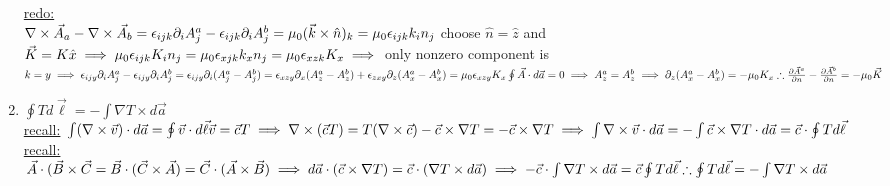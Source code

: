 \documentclass[12pt]{amsart}
\begin{document}
\begin{enumerate}
\underline{redo:}\\
$\nabla \times \vec{A}_a - \nabla \times \vec{A}_b = \epsilon_{ijk} \partial_i A_j^a - \epsilon_{ijk} \partial_i A^b_j\\
= \mu_0 (\vec{k} \times \hat{n})_k = \mu_0 \epsilon_{ijk} k_i n_j\\$
choose $\hat{n} = \hat{z}$ and $\vec{K} = K \hat{x}\\
\implies \mu_0 \epsilon_{ijk} K_i n_j = \mu_0 \epsilon_{x j k} k_x n_j = \mu_0 \epsilon_{xzk} K_x\\
\implies$ only nonzero component is $k=y\\
\implies \epsilon_{ijy} \partial_i A_j^a - \epsilon_{ijy} \partial_i A_j^b\\
= \epsilon_{ijy} \partial_i ( A_j^a - A_j^b) = \epsilon_{xzy} \partial_x (A_z^a- A_z^b) + \epsilon_{zxy} \partial_z (A_x^a - A_x^b) = \mu_0 \epsilon_{xzy} K_x\\
\oint \vec{A} \cdot d \vec{a} = 0 \implies A_z^a = A^b_z\\
\implies \partial_z ( A_x^a - A_x^b) = - \mu_0 K_x\\
\therefore \frac{\partial \vec{A}^a}{\partial n} - \frac{\partial \vec{A}^b}{\partial n} = - \mu_0 \vec{K}$


\hdashrule[0.5ex][c]{\linewidth}{0.5pt}{1.5mm}


\item \underline{$\oint T d \vec{\ell} = - \int \nabla T \times d \vec{a}$}\\
\underline{recall:} $\int (\nabla \times \vec{v}) \cdot d \vec{a} = \oint \vec{v} \cdot d \vec{\ell}\\
\vec{v} = \vec{c} T\\
\implies \nabla \times ( \vec{c} T) = T ( \nabla \times \vec{c}) - \vec{c} \times \nabla T = - \vec{c} \times \nabla T\\
\implies \int \nabla \times \vec{v} \cdot d \vec{a} = - \int \vec{c} \times \nabla T \cdot d \vec{a} = \vec{c} \cdot \oint T d \vec{\ell}\\$
\underline{recall:} $\vec{A} \cdot ( \vec{B} \times \vec{C} = \vec{B} \cdot ( \vec{C} \times \vec{A}) = \vec{C} \cdot ( \vec{A} \times \vec{B})\\
\implies d \vec{a} \cdot ( \vec{c} \times \nabla T) = \vec{c} \cdot ( \nabla T \times d \vec{a})\\
\implies - \vec{c} \cdot \int \nabla T \times d \vec{a} = \vec{c} \oint T d \vec{\ell}\\
\therefore \oint T d \vec{\ell} = - \int \nabla T \times d \vec{a}\\$



\end{enumerate}
\end{document}
